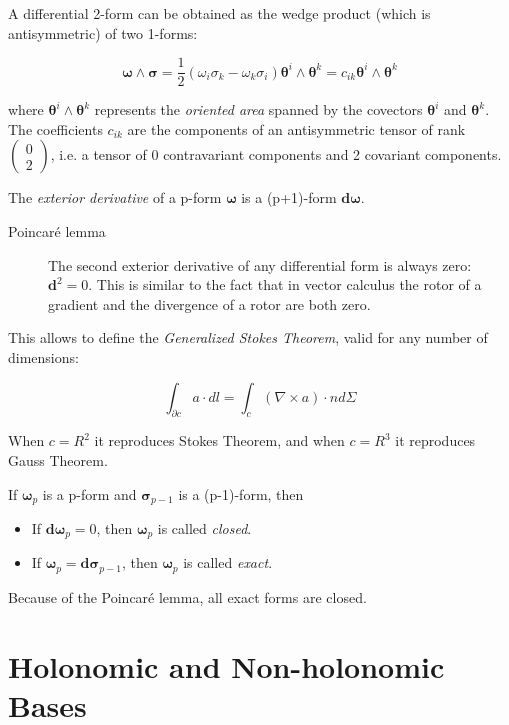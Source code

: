 \documentclass[english, 12pt]{book}
\begin{document}
A differential 2-form can be obtained as the wedge product (which is antisymmetric) of two 1-forms:

\[
\boldsymbol{\omega} \land \boldsymbol{\sigma} = \frac{1}{2} (\omega_i \sigma_k - \omega_k \sigma_i) \boldsymbol{\theta}^i \land \boldsymbol{\theta}^k = c_{ik} \boldsymbol{\theta}^i \land \boldsymbol{\theta}^k
\]

where $\boldsymbol{\theta}^i \land \boldsymbol{\theta}^k$ represents the \emph{oriented area} spanned by the covectors $\boldsymbol{\theta}^i$ and $\boldsymbol{\theta}^k$. The coefficients $c_{ik}$ are the components of an antisymmetric tensor of rank $\left( \begin{array}{c} 0 \\ 2 \end{array} \right)$, i.e. a tensor of 0 contravariant components and 2 covariant components.

The \emph{exterior derivative} of a p-form $\boldsymbol{\omega}$ is a (p+1)-form $\mathbf{d}\boldsymbol{\omega}$.

\begin{description}
	\item[Poincaré lemma] The second exterior derivative of any differential form is always zero: $\mathbf{d}^2 = 0$. This is similar to the fact that in vector calculus the rotor of a gradient and the divergence of a rotor are both zero.
\end{description}

This allows to define the \emph{Generalized Stokes Theorem}, valid for any number of dimensions:

\[
\int_{\partial c} a \cdot dl = \int_c ( \nabla \times a ) \cdot n d\Sigma
\]

When $c=R^2$ it reproduces Stokes Theorem, and when $c=R^3$ it reproduces Gauss Theorem.

If $\boldsymbol{\omega}_p$ is a p-form and $\boldsymbol{\sigma}_{p-1}$ is a (p-1)-form, then
\begin{itemize}
	\item If $\boldsymbol{d\omega}_p = 0$, then $\boldsymbol{\omega}_p$ is called \emph{closed}.
	\item If $\boldsymbol{\omega}_p = \boldsymbol{d\sigma}_{p-1}$, then $\boldsymbol{\omega}_p$ is called \emph{exact}.
\end{itemize}

Because of the Poincaré lemma, all exact forms are closed.


\section{Holonomic and Non-holonomic Bases}
\end{document}
